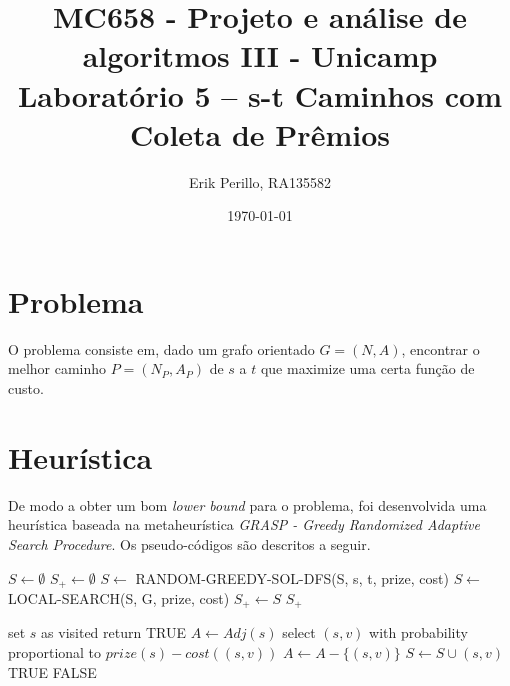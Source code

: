 \documentclass[7pt]{article}
\newcommand{\tit}[1]{\textit{#1}}
\newcommand{\tbf}[1]{\textbf{#1}}
\begin{document}
\author{\small Erik Perillo, RA135582}
\date{\small \today}
\title{\vspace{-2cm}%
	{\small MC658 - Projeto e análise de algoritmos III - Unicamp}\\
    {\Large \tbf{Laboratório 5 -- s-t Caminhos com Coleta de Prêmios}}}
\maketitle\vspace{-0.5cm}

\makeatletter
\def\BState{\State\hskip-\ALG@thistlm}
\makeatother

\begin{multicols}{2}

\section{Problema}
O problema consiste em, dado um grafo orientado $G = (N, A)$, encontrar o
melhor caminho $P = (N_P, A_P)$ de $s$ a $t$ que maximize uma certa
função de custo.

\section{Heurística}
De modo a obter um bom \tit{lower bound} para o problema, foi desenvolvida
uma heurística baseada na metaheurística
\tit{GRASP - Greedy Randomized Adaptive Search Procedure}.
Os pseudo-códigos são descritos a seguir.
\end{multicols}

\begin{algorithm}
\caption{}\label{grasp}
\begin{algorithmic}[1]
    \State $S \gets \emptyset$
    \State $S_+ \gets \emptyset$
        \State $S \gets$ RANDOM-GREEDY-SOL-DFS(S, s, t, prize, cost)
        \State $S \gets$ LOCAL-SEARCH(S, G, prize, cost)
            \State $S_+ \gets S$
        \EndIf
	\EndFor
    \Return $S_+$
    \EndProcedure
\end{algorithmic}
\end{algorithm}

\begin{algorithm}
\caption{}\label{random-dfs}
\begin{algorithmic}[1]
    \State set $s$ as visited
        \State return TRUE
    \EndIf
    \State $A \gets Adj(s)$
        \State select $(s, v)$ with probability proportional to
            $prize(s) - cost((s,v))$
        \State $A \gets A - \{(s, v)\}$
            \State $S \gets S \cup {(s, v)}$
            \State \Return TRUE
        \EndIf
    \EndWhile
    \State \Return FALSE
    \EndProcedure
\end{algorithmic}
\end{algorithm}
\end{document}

